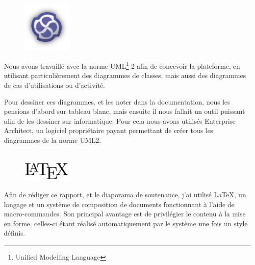 \begin{figure}
	\includegraphics[width=2.5cm]{contents/images/logoEnterpriseArchitect.png}
\end{figure}
Nous avons travaillé avec la norme UML\footnote{Unified Modelling Language} 2 afin de concevoir la plateforme, en utilisant particulièrement des diagrammes de classes, mais aussi des diagrammes de cas d'utilisations ou d'activité. 

Pour dessiner ces diagrammes, et les noter dans la documentation, nous les pensions d'abord sur tableau blanc, mais ensuite il nous fallait un outil puissant afin de les dessiner sur informatique. Pour cela nous avons utilisés Enterprise Architect, un logiciel propriétaire payant permettant de créer tous les diagrammes de la norme UML2.\\~

\begin{figure}
	\includegraphics[width=2.5cm]{contents/images/logoLatex.png}
\end{figure}
Afin de rédiger ce rapport, et le diaporama de soutenance, j'ai utilisé \LaTeX{}, un langage et un système de composition de documents fonctionnant à l'aide de macro-commandes. Son principal avantage est de privilégier le contenu à la mise en forme, celles-ci étant réalisé automatiquement par le système une fois un style définis. 